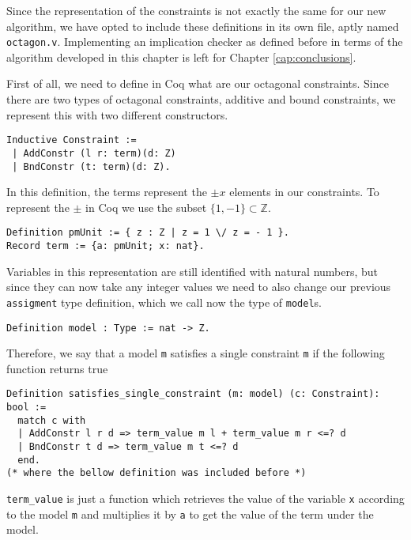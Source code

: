Since the representation of the constraints is not exactly the same for our new 
algorithm, we have opted to include these definitions in its own file, aptly named
\verb|octagon.v|. Implementing an implication checker as defined before in terms of
the algorithm developed in this chapter is left for Chapter \ref{cap:conclusions}.

First of all, we need to define in Coq what are our octagonal constraints. Since 
there are two types of octagonal constraints, additive and bound constraints, we
represent this with two different constructors.

\begin{verbatim}
Inductive Constraint :=
 | AddConstr (l r: term)(d: Z)
 | BndConstr (t: term)(d: Z).
\end{verbatim}

In this definition, the terms represent the $\pm x$ elements in our constraints. To
represent the $\pm$ in Coq we use the subset $\{1,-1\} \subset \mathbb{Z}$.

\begin{verbatim}
Definition pmUnit := { z : Z | z = 1 \/ z = - 1 }.
Record term := {a: pmUnit; x: nat}.
\end{verbatim}

Variables in this representation are still identified with natural numbers, but since
they can now take any integer values we need to also change our previous \texttt{assigment}
type definition, which we call now the type of \texttt{model}s.

\begin{verbatim}
Definition model : Type := nat -> Z.
\end{verbatim}

Therefore, we say that a model \texttt{m} satisfies a single constraint \texttt{m}
if the following function returns true

\begin{verbatim}
Definition satisfies_single_constraint (m: model) (c: Constraint): bool :=
  match c with 
  | AddConstr l r d => term_value m l + term_value m r <=? d
  | BndConstr t d => term_value m t <=? d
  end.
(* where the bellow definition was included before *)
\end{verbatim}

\texttt{term_value} is just a function which retrieves the value of the variable 
\texttt{x} according to the model \texttt{m} and multiplies it by \texttt{a}
to get the value of the term under the model.

